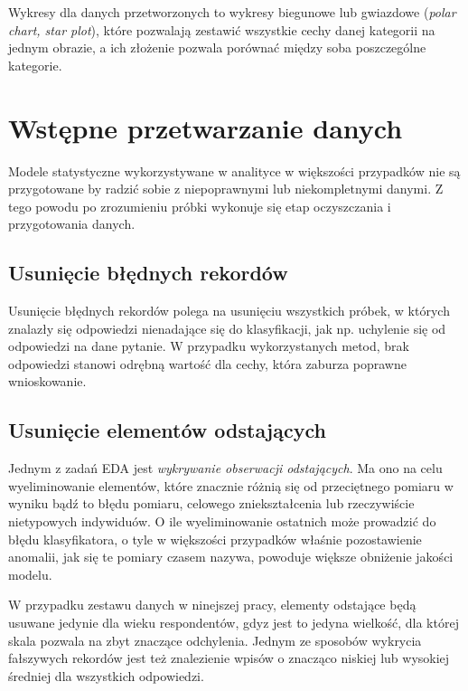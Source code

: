 \documentclass[12pt,a4paper,oneside]{report} %
\begin{document}
Wykresy dla danych przetworzonych to wykresy biegunowe lub gwiazdowe (\emph{polar chart, star plot}), które pozwalają zestawić wszystkie cechy danej kategorii na jednym obrazie, a ich złożenie pozwala porównać między soba poszczególne kategorie. \par




\section{Wstępne przetwarzanie danych}

Modele statystyczne wykorzystywane w analityce w większości przypadków nie są przygotowane by radzić sobie z niepoprawnymi lub niekompletnymi danymi. Z tego powodu po zrozumieniu próbki wykonuje się etap oczyszczania i przygotowania danych. \par




\subsection{Usunięcie błędnych rekordów}

Usunięcie błędnych rekordów polega na usunięciu wszystkich próbek, w których znalazły się odpowiedzi nienadające się do klasyfikacji, jak np. uchylenie się od odpowiedzi na dane pytanie. W przypadku wykorzystanych metod, brak odpowiedzi stanowi odrębną wartość dla cechy, która zaburza poprawne wnioskowanie. \par


\subsection{Usunięcie elementów odstających}

Jednym z zadań EDA jest \emph{wykrywanie obserwacji odstających}. Ma ono na celu wyeliminowanie elementów, które znacznie różnią się od przeciętnego pomiaru w wyniku bądź to błędu pomiaru, celowego zniekształcenia lub rzeczywiście nietypowych indywiduów. O ile wyeliminowanie ostatnich może prowadzić do błędu klasyfikatora, o tyle w większości przypadków właśnie pozostawienie anomalii, jak się te pomiary czasem nazywa, powoduje większe obniżenie jakości modelu. \cite{dudek} \par

W przypadku zestawu danych w ninejszej pracy, elementy odstające będą usuwane jedynie dla wieku respondentów, gdyz jest to jedyna wielkość, dla której skala pozwala na zbyt znaczące odchylenia. Jednym ze sposobów wykrycia fałszywych rekordów jest też znalezienie wpisów o znacząco niskiej lub wysokiej średniej dla wszystkich odpowiedzi. \par
\end{document}
